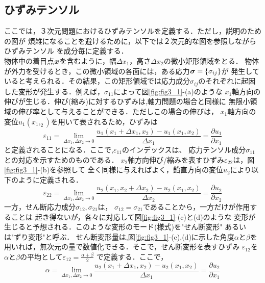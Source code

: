 \documentclass[10pt,a4j]{jarticle}
\begin{document}
\subsection{ひずみテンソル}
ここでは，３次元問題におけるひずみテンソルを定義する．ただし，説明のための図が
煩雑になることを避けるために，以下では２次元的な図を参照しながらひずみテンソル
を成分毎に定義する．\\

物体中の着目点$\mbox{\boldmath $x$}$を含むように，幅$\Delta x_1$，高さ$\Delta x_2$の微小矩形領域をとる．
物体が外力を受けるとき，この微小領域の各面には，ある応力$\mbox{\boldmath $\sigma$}=\{\sigma_{ij}\}$が
発生していると考えられる．その結果，この矩形領域では応力成分$\sigma_{ij}$のそれぞれに起因
した変形が発生する．例えば，$\sigma_{11}$によって図\ref{fig:fig3_1}-(a)のような
$x_1$軸方向の伸びが生じる．伸び(縮み)に対するひずみは,軸力問題の場合と同様に
無限小領域の伸び率として与えることができる．ただしこの場合の伸びは，
$x_1$軸方向の変位$u_1(x_1,_2)$を用いて表されるため，ひずみは
\begin{equation}
	\varepsilon_{11}=\lim_{\Delta x_1,\Delta x_2 \rightarrow 0}
	\frac{u_1(x_1+\Delta x_1,x_2)-u_1(x_1,x_2)}{\Delta x_1}
	=\frac{\partial u_1}{\partial x_1}
	\label{eqn:def_e11}
\end{equation}
と定義されることになる．ここで,$\varepsilon_{11}$のインデックスは、
応力テンソル成分$\sigma_{11}$との対応を示すためのものである．
$x_2$軸方向伸び/縮みを表すひずみ$\varepsilon_{22}$は，図\ref{fig:fig3_1}-(b)を参照して
全く同様に与えればよく，鉛直方向の変位$u_2$により以下のように定義される．
\begin{equation}
	\varepsilon_{22}=\lim_{\Delta x_1,\Delta x_2 \rightarrow 0}
	\frac{u_2(x_1,x_2+\Delta x_2)-u_2(x_1,x_2)}{\Delta x_2}
	=\frac{\partial u_2}{\partial x_2}
	\label{eqn:def_e22}
\end{equation}
一方，せん断応力成分$\sigma_{12}, \sigma_{21}$は，
$\sigma_{12}=\sigma_{21}$であることから，一方だけが作用することは
起き得ないが，各々に対応して図\ref{fig:fig3_1}-(c)と(d)のような
変形が生じると予想される．このような変形のモード(様式)を"せん断変形"
あるいは"ずり変形"と呼ぶ．
せん断変形量は,図\ref{fig:fig3_1}-(c),(d)に示した角度$\alpha$と$\beta$を
用いれば，無次元の量で数値化できる．そこで，せん断変形を表すひずみ
$\varepsilon_{12}$を$\alpha$と$\beta$の平均として$\varepsilon_{12}=\frac{\alpha+\beta}{2}$
で定義する．ここで，
\begin{equation}
	\alpha=
	\lim_{\Delta x_1,\Delta x_2 \rightarrow 0}
	\frac{u_2(x_1+\Delta x_1,x_2)-u_2(x_1,x_2)}{\Delta x_1}
	=\frac{\partial u_2}{\partial x_1}
	\label{eqn:alpha}
\end{equation}
\end{document}
